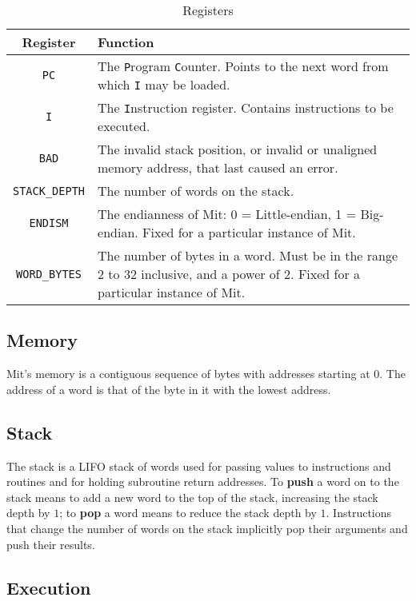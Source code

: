 \documentclass[a4paper]{article}
\begin{document}
\begin{table}[htbp]
\begin{center}
\begin{tabular}{cp{3.75in}} \toprule
\bf Register & \bf Function \\
 \midrule
{\tt PC} & The {\tt P}rogram {\tt C}ounter. Points to the next word from which {\tt I} may be loaded. \\
{\tt I} & The {\tt I}nstruction register. Contains instructions to be executed. \\
{\tt BAD} & The invalid stack position, or invalid or unaligned memory address, that last caused an error. \\
{\tt STACK\_DEPTH} & The number of words on the stack. \\
{\tt ENDISM} & The endianness of Mit: 0 = Little-endian, 1 = Big-endian. Fixed for a particular instance of Mit. \\
{\tt WORD\_BYTES} & The number of bytes in a word. Must be in the range $2$ to $32$ inclusive, and a power of $2$. Fixed for a particular instance of Mit. \\
 \bottomrule
\end{tabular}
\caption{\label{regtable}Registers}
\end{center}
\end{table}


\subsection{Memory}

Mit's memory is a contiguous sequence of bytes with addresses
starting at $0$. The address of a word is that of the byte in it with the
lowest address.


\subsection{Stack}

The stack is a LIFO stack of words used for passing values to instructions and routines and for holding subroutine return addresses. To {\bf push} a word on to the stack means to add a new word to the top of the stack, increasing the stack depth by $1$; to {\bf pop} a word means to reduce the stack depth by $1$. Instructions that change the number of words on the stack implicitly pop their arguments and push their results.


\subsection{Execution}
\label{execution}
\end{document}
